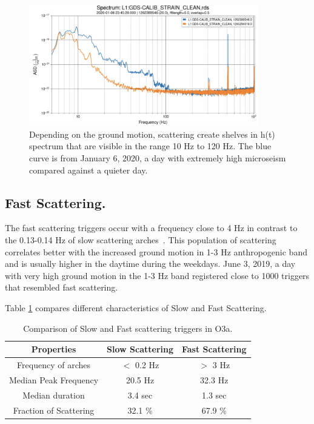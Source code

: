 \documentclass[12pt]{iopart}
\begin{document}
\begin{figure}[h]
    \centering
    \includegraphics[width=10cm]{scatshelf2.png}
    \caption{ Depending on the ground motion, scattering create shelves in h(t) spectrum that are visible in the range 10 Hz to 120 Hz. The blue curve is from January 6, 2020, a day with extremely high microseism compared against a quieter day.}
    \label{fig:scatshelf1}
\end{figure}



\subsection{Fast Scattering.}
The fast scattering triggers occur with a frequency close to 4 Hz in contrast to the 0.13-0.14 Hz of slow scattering arches~\cite{alogjosh}. This population of scattering correlates better with the increased ground motion in  1-3 Hz anthropogenic band and is usually higher in the daytime during the weekdays. June 3, 2019, a day with very high ground motion in the 1-3 Hz band registered close to 1000 triggers that resembled fast scattering. 


Table \ref{tab:fastslowtab} compares different characteristics of Slow and Fast Scattering.
\begin{table}[h]
    \centering
    \begin{tabular}{c|c|c}
    \hline
      \textbf{Properties}   &  \textbf{Slow Scattering} & 
      \textbf{Fast Scattering}\\
      \hline
       Frequency of arches  & $<$ 0.2 Hz & $>$ 3 Hz \\
      \hline
      Median Peak Frequency & 20.5 Hz & 32.3 Hz \\
      \hline
      Median duration & 3.4 sec & 1.3 sec \\
      \hline
      Fraction of Scattering & 32.1 \% & 67.9 \% \\
       
    \hline
    \end{tabular}
    \caption{Comparison of Slow and Fast scattering triggers in O3a.}
    \label{tab:fastslowtab}
\end{table}{}
\end{document}
